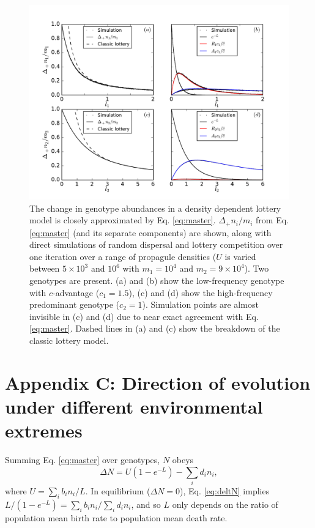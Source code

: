 \documentclass[11pt]{article}
\begin{document}
\begin{figure}
\centering
\includegraphics[scale=0.7]{simulationcomparison.pdf}
\caption{\label{fig:simcomp} The change in genotype abundances in a density dependent lottery model is closely approximated by Eq. \eqref{eq:master}. $\Delta_+ n_i/m_i$ from Eq. \eqref{eq:master} (and its separate components) are shown, along with direct simulations of random dispersal and lottery competition over one iteration over a range of propagule densities ($U$ is varied between $5\times 10^3$ and $10^6$ with $m_1=10^4$ and $m_2=9\times 10^4$). Two genotypes are present. (a) and (b) show the low-frequency genotype with $c$-advantage ($c_1=1.5$), (c) and (d) show the high-frequency predominant genotype ($c_2=1$). Simulation points are almost invisible in (c) and (d) due to near exact agreement with Eq. \eqref{eq:master}. Dashed lines in (a) and (c) show the breakdown of the classic lottery model.} 
\end{figure}

\section*{Appendix C: Direction of evolution under different environmental extremes}

Summing Eq. \eqref{eq:master} over genotypes, $N$ obeys 
\begin{equation}
\Delta N=U(1-e^{-L})-\sum_i d_i n_i,\label{eq:deltN}
\end{equation}
where $U=\sum_i b_i n_i/L$. In equilibrium ($\Delta N=0$), Eq. \eqref{eq:deltN} implies $L/(1-e^{-L})=\sum_i b_i n_i/\sum_i d_i n_i$, and so $L$ only depends on the ratio of population mean birth rate to population mean death rate. 
\end{document}
